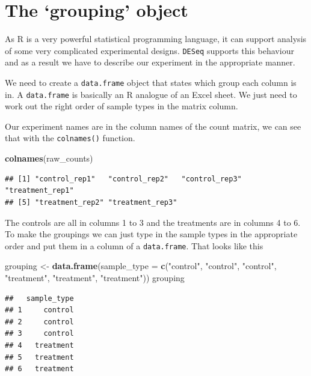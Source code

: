 \documentclass[]{book}
\newenvironment{Shaded}{\begin{snugshade}}{\end{snugshade}}
\newcommand{\DataTypeTok}[1]{\textcolor[rgb]{0.13,0.29,0.53}{#1}}
\newcommand{\KeywordTok}[1]{\textcolor[rgb]{0.13,0.29,0.53}{\textbf{#1}}}
\newcommand{\NormalTok}[1]{#1}
\newcommand{\StringTok}[1]{\textcolor[rgb]{0.31,0.60,0.02}{#1}}
\begin{document}
\hypertarget{the-grouping-object}{%
\section{The `grouping' object}\label{the-grouping-object}}

As R is a very powerful statistical programming language, it can support analysis of some very complicated experimental designs. \texttt{DESeq} supports this behaviour and as a result we have to describe our experiment in the appropriate manner.

We need to create a \texttt{data.frame} object that states which group each column is in. A \texttt{data.frame} is basically an R analogue of an Excel sheet. We just need to work out the right order of sample types in the matrix column.

Our experiment names are in the column names of the count matrix, we can see that with the \texttt{colnames()} function.

\begin{Shaded}
\begin{Highlighting}[]
\KeywordTok{colnames}\NormalTok{(raw_counts)}
\end{Highlighting}
\end{Shaded}

\begin{verbatim}
## [1] "control_rep1"   "control_rep2"   "control_rep3"   "treatment_rep1"
## [5] "treatment_rep2" "treatment_rep3"
\end{verbatim}

The controls are all in columns 1 to 3 and the treatments are in columns 4 to 6. To make the groupings we can just type in the sample types in the appropriate order and put them in a column of a \texttt{data.frame}. That looks like this

\begin{Shaded}
\begin{Highlighting}[]
\NormalTok{grouping <-}\StringTok{ }\KeywordTok{data.frame}\NormalTok{(}\DataTypeTok{sample_type =}  \KeywordTok{c}\NormalTok{(}\StringTok{"control"}\NormalTok{, }\StringTok{"control"}\NormalTok{, }\StringTok{"control"}\NormalTok{, }\StringTok{"treatment"}\NormalTok{, }\StringTok{"treatment"}\NormalTok{, }\StringTok{"treatment"}\NormalTok{))}
\NormalTok{grouping}
\end{Highlighting}
\end{Shaded}

\begin{verbatim}
##   sample_type
## 1     control
## 2     control
## 3     control
## 4   treatment
## 5   treatment
## 6   treatment
\end{verbatim}
\end{document}
